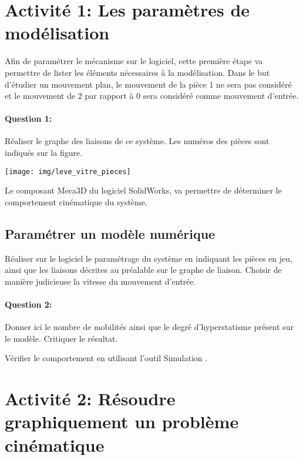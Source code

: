 

\section{Activité 1: Les paramètres de modélisation}

\begin{minipage}{0.45\linewidth}
Afin de paramétrer le mécanisme sur le logiciel, cette première étape va permettre de lister les éléments nécessaires à la modélisation. Dans le but d'étudier un mouvement plan, le mouvement de la pièce 1 ne sera pas considéré et le mouvement de 2 par rapport à 0 sera considéré comme mouvement d'entrée.

\paragraph{Question 1:} Réaliser le graphe des liaisons de ce système. Les numéros des pièces sont indiqués sur la figure. 
\end{minipage}
\hfill
\begin{minipage}{0.48\linewidth}
	\texttt{[image: img/leve\_vitre\_pieces]}
\end{minipage}

\vspace{5cm}

Le composant \og Meca3D \fg du logiciel SolidWorks, va permettre de déterminer le comportement cinématique du système.

\subsection{Paramétrer un modèle numérique}

Réaliser sur le logiciel le paramétrage du système en indiquant les pièces en jeu, ainsi que les liaisons décrites au préalable sur le graphe de liaison. Choisir de manière judicieuse la vitesse du mouvement d'entrée.

\paragraph{Question 2:} Donner ici le nombre de mobilités ainsi que le degré d'hyperstatisme présent sur le modèle. Critiquer le résultat.

\reponse[1]

Vérifier le comportement en utilisant l'outil \og Simulation \fg.

\section{Activité 2: Résoudre graphiquement un problème cinématique}

